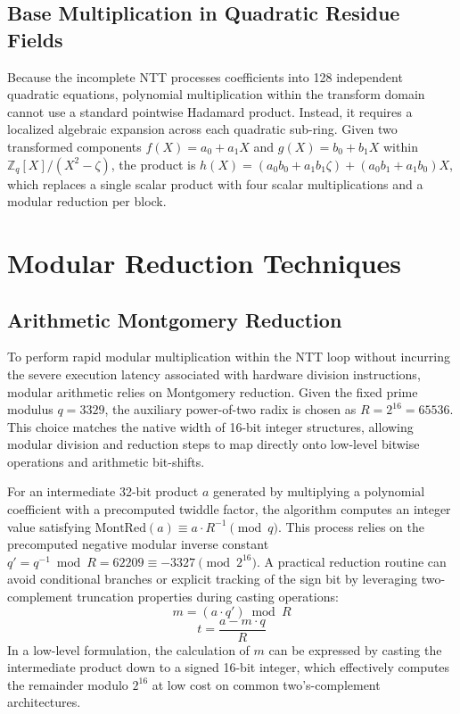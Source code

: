 \subsection{Base Multiplication in Quadratic Residue Fields}
\label{sub:base_mul_merging_invntt}

Because the incomplete NTT processes coefficients into 128 independent quadratic equations, polynomial multiplication within the transform domain cannot use a standard pointwise Hadamard product. Instead, it requires a localized algebraic expansion across each quadratic sub-ring. Given two transformed components $f(X) = a_0 + a_1X$ and $g(X) = b_0 + b_1X$ within $\mathbb{Z}_q[X]/(X^2 - \zeta)$, the product is $h(X) = (a_0 b_0 + a_1 b_1 \zeta) + (a_0 b_1 + a_1 b_0)X$, which replaces a single scalar product with four scalar multiplications and a modular reduction per block.

\section{Modular Reduction Techniques}
\label{sec:modular_reduction_techniques}

\subsection{Arithmetic Montgomery Reduction}
\label{sub:montgomery_reduction}

To perform rapid modular multiplication within the NTT loop without incurring the severe execution latency associated with hardware division instructions, modular arithmetic relies on Montgomery reduction. Given the fixed prime modulus $q = 3329$, the auxiliary power-of-two radix is chosen as $R = 2^{16} = 65536$. This choice matches the native width of 16-bit integer structures, allowing modular division and reduction steps to map directly onto low-level bitwise operations and arithmetic bit-shifts.

For an intermediate 32-bit product $a$ generated by multiplying a polynomial coefficient with a precomputed twiddle factor, the algorithm computes an integer value satisfying $\text{MontRed}(a) \equiv a \cdot R^{-1} \pmod{q}$. This process relies on the precomputed negative modular inverse constant $q' = q^{-1} \bmod R = 62209 \equiv -3327 \pmod{2^{16}}$. A practical reduction routine can avoid conditional branches or explicit tracking of the sign bit by leveraging two-complement truncation properties during casting operations:
\begin{equation}
    m = (a \cdot q') \bmod R
\end{equation}
\begin{equation}
    t = \frac{a - m \cdot q}{R}
\end{equation}
In a low-level formulation, the calculation of $m$ can be expressed by casting the intermediate product down to a signed 16-bit integer, which effectively computes the remainder modulo $2^{16}$ at low cost on common two's-complement architectures.


